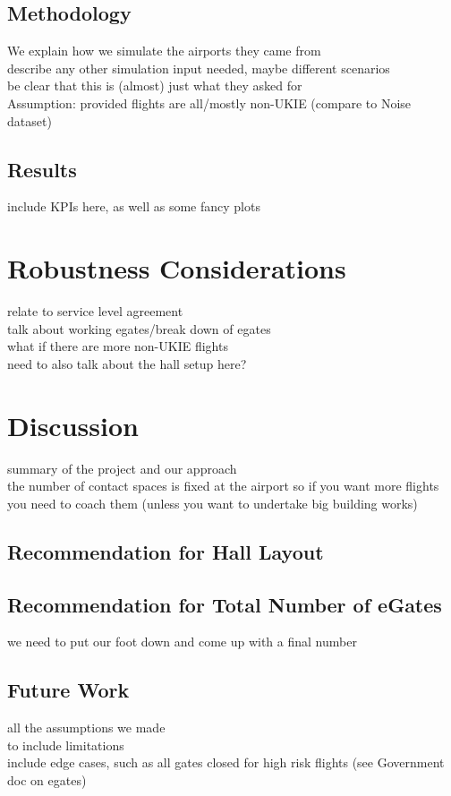 \documentclass[10pt]{article}
\begin{document}
\subsection{Methodology}
We explain how we simulate the airports they came from \\
describe any other simulation input needed, maybe different scenarios \\ 
be clear that this is (almost) just what they asked for  \\ Assumption: provided flights are all/mostly non-UKIE (compare to Noise dataset)



\subsection{Results}
include KPIs here, as well as some fancy plots
\subsubsection{}


\section{Robustness Considerations}
relate to service level agreement \\
talk about working \glspl{egate}/break down of \glspl{egate}  \\
what if there are more non-UKIE flights  \\ 
need to also talk about the hall setup here?



\section{Discussion}
summary of the project and our approach \\
the number of contact spaces is fixed at the airport so if you want more flights you need to coach them (unless you want to undertake big building works)

\subsection{Recommendation for Hall Layout}

\subsection{Recommendation for Total Number of eGates}
we need to put our foot down and come up with a final number

\subsection{Future Work}
all the assumptions we made \\
to include limitations \\
include edge cases, such as all gates closed for high risk flights (see Government doc on \glspl{egate}) 

{\footnotesize
}
% 
\end{document}
